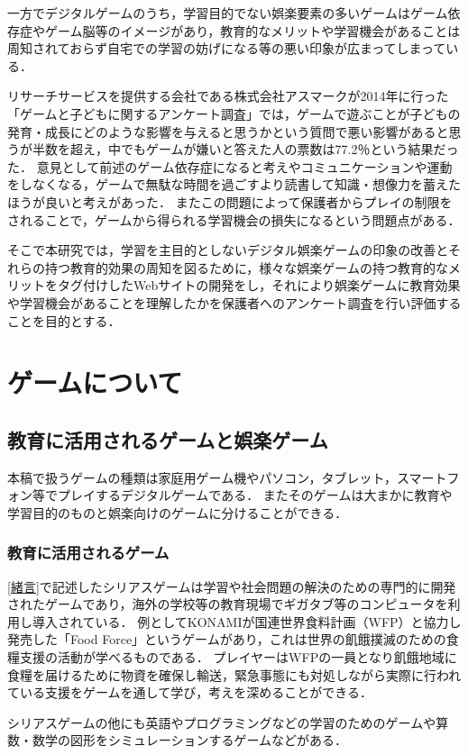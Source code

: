 \documentclass[12pt,a4j,titlepage]{ltjsarticle}
\begin{document}
一方でデジタルゲームのうち，学習目的でない娯楽要素の多いゲームはゲーム依存症やゲーム脳等のイメージがあり，教育的なメリットや学習機会があることは周知されておらず自宅での学習の妨げになる等の悪い印象が広まってしまっている．

リサーチサービスを提供する会社である株式会社アスマークが2014年に行った「ゲームと子どもに関するアンケート調査」\cite{gameanq}では，ゲームで遊ぶことが子どもの発育・成長にどのような影響を与えると思うかという質問で悪い影響があると思うが半数を超え，中でもゲームが嫌いと答えた人の票数は77.2％という結果だった．
意見として前述のゲーム依存症になると考えやコミュニケーションや運動をしなくなる，ゲームで無駄な時間を過ごすより読書して知識・想像力を蓄えたほうが良いと考えがあった．
またこの問題によって保護者からプレイの制限をされることで，ゲームから得られる学習機会の損失になるという問題点がある．

そこで本研究では，学習を主目的としないデジタル娯楽ゲームの印象の改善とそれらの持つ教育的効果の周知を図るために，様々な娯楽ゲームの持つ教育的なメリットをタグ付けしたWebサイトの開発をし，それにより娯楽ゲームに教育効果や学習機会があることを理解したかを保護者へのアンケート調査を行い評価することを目的とする．
\section{ゲームについて}
\subsection{教育に活用されるゲームと娯楽ゲーム}
本稿で扱うゲームの種類は家庭用ゲーム機やパソコン，タブレット，スマートフォン等でプレイするデジタルゲームである．
またそのゲームは大まかに教育や学習目的のものと娯楽向けのゲームに分けることができる．

\subsubsection{教育に活用されるゲーム}\label{教育ゲーム}
\ref{緒言}で記述したシリアスゲームは学習や社会問題の解決のための専門的に開発されたゲームであり，海外の学校等の教育現場でギガタブ等のコンピュータを利用し導入されている．
例としてKONAMIが国連世界食料計画（WFP）と協力し発売した「Food Force」というゲームがあり，これは世界の飢餓撲滅のための食糧支援の活動が学べるものである．
プレイヤーはWFPの一員となり飢餓地域に食糧を届けるために物資を確保し輸送，緊急事態にも対処しながら実際に行われている支援をゲームを通して学び，考えを深めることができる．

シリアスゲームの他にも英語やプログラミングなどの学習のためのゲームや算数・数学の図形をシミュレーションするゲームなどがある．
\end{document}

